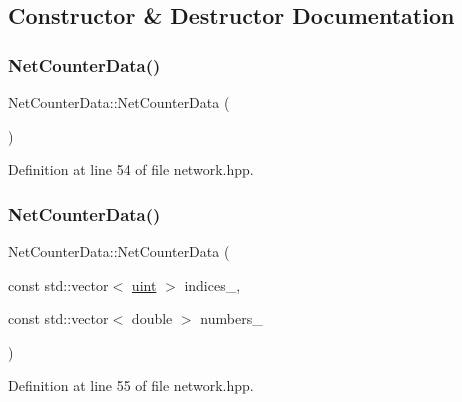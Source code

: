 \subsection{Constructor \& Destructor Documentation}
\mbox{\label{class_net_counter_data_ac3a5083286ad4fad43e6b6d5db1f7caa}} 
\subsubsection{\texorpdfstring{Net\+Counter\+Data()}{NetCounterData()}\hspace{0.1cm}{\footnotesize\ttfamily [1/2]}}
{\footnotesize\ttfamily Net\+Counter\+Data\+::\+Net\+Counter\+Data (\begin{DoxyParamCaption}{ }\end{DoxyParamCaption})\hspace{0.3cm}{\ttfamily [inline]}}



Definition at line 54 of file network.\+hpp.

\mbox{\label{class_net_counter_data_ac816e1f8892a4d6f500df387309c1b1b}} 
\subsubsection{\texorpdfstring{Net\+Counter\+Data()}{NetCounterData()}\hspace{0.1cm}{\footnotesize\ttfamily [2/2]}}
{\footnotesize\ttfamily Net\+Counter\+Data\+::\+Net\+Counter\+Data (\begin{DoxyParamCaption}\item[{const std\+::vector$<$ \hyperlink{typedefs_8hpp_a91ad9478d81a7aaf2593e8d9c3d06a14}{uint} $>$}]{indices\+\_\+,  }\item[{const std\+::vector$<$ double $>$}]{numbers\+\_\+ }\end{DoxyParamCaption})\hspace{0.3cm}{\ttfamily [inline]}}



Definition at line 55 of file network.\+hpp.

